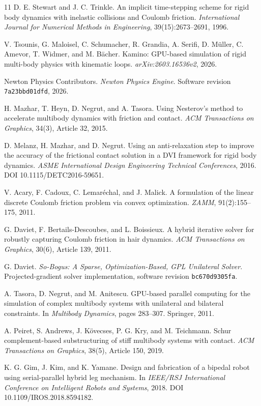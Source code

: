 \begin{thebibliography}{11}
D. E. Stewart and J. C. Trinkle.
An implicit time-stepping scheme for rigid body dynamics with inelastic collisions and Coulomb friction.
\emph{International Journal for Numerical Methods in Engineering}, 39(15):2673--2691, 1996.

V. Tsounis, G. Maloisel, C. Schumacher, R. Grandia, A. Serifi, D. M\"uller, C. Amevor, T. Widmer, and M. B\"acher.
Kamino: GPU-based simulation of rigid multi-body physics with kinematic loops.
\emph{arXiv:2603.16536v2}, 2026.

Newton Physics Contributors.
\emph{Newton Physics Engine}. Software revision \texttt{7a23bbd01dfd}, 2026.

H. Mazhar, T. Heyn, D. Negrut, and A. Tasora.
Using Nesterov's method to accelerate multibody dynamics with friction and contact.
\emph{ACM Transactions on Graphics}, 34(3), Article 32, 2015.

D. Melanz, H. Mazhar, and D. Negrut.
Using an anti-relaxation step to improve the accuracy of the frictional contact solution in a DVI framework for rigid body dynamics.
\emph{ASME International Design Engineering Technical Conferences}, 2016. DOI 10.1115/DETC2016-59651.

V. Acary, F. Cadoux, C. Lemar\'echal, and J. Malick.
A formulation of the linear discrete Coulomb friction problem via convex optimization.
\emph{ZAMM}, 91(2):155--175, 2011.

G. Daviet, F. Bertails-Descoubes, and L. Boissieux.
A hybrid iterative solver for robustly capturing Coulomb friction in hair dynamics.
\emph{ACM Transactions on Graphics}, 30(6), Article 139, 2011.

G. Daviet.
\emph{So-Bogus: A Sparse, Optimization-Based, GPL Unilateral Solver}. Projected-gradient solver implementation, software revision \texttt{bc670d9305fa}.

A. Tasora, D. Negrut, and M. Anitescu.
GPU-based parallel computing for the simulation of complex multibody systems with unilateral and bilateral constraints.
In \emph{Multibody Dynamics}, pages 283--307. Springer, 2011.

A. Peiret, S. Andrews, J. K\"ovecses, P. G. Kry, and M. Teichmann.
Schur complement-based substructuring of stiff multibody systems with contact.
\emph{ACM Transactions on Graphics}, 38(5), Article 150, 2019.

K. G. Gim, J. Kim, and K. Yamane.
Design and fabrication of a bipedal robot using serial-parallel hybrid leg mechanism.
In \emph{IEEE/RSJ International Conference on Intelligent Robots and Systems}, 2018. DOI 10.1109/IROS.2018.8594182.
\end{thebibliography}
